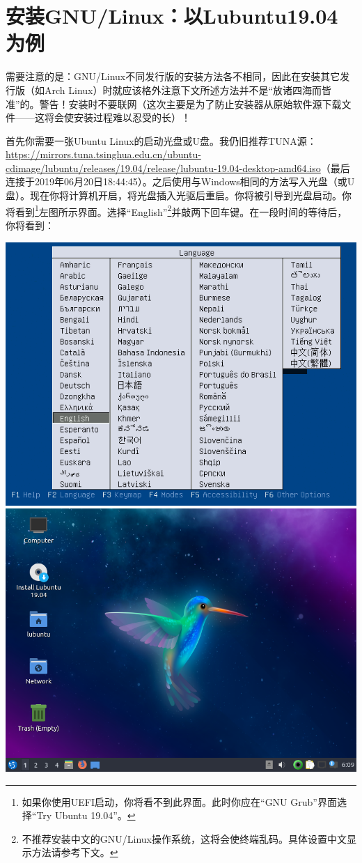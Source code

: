 \documentclass{book}
\begin{document}
\section{安装GNU/Linux：以Lubuntu19.04为例}
需要注意的是：GNU/Linux不同发行版的安装方法各不相同，因此在安装其它发行版（如Arch Linux）时就应该格外注意下文所述方法并不是“放诸四海而皆准”的。警告！安装时不要联网（这次主要是为了防止安装器从原始软件源下载文件——这将会使安装过程难以忍受的长）！\par
首先你需要一张Ubuntu Linux的启动光盘或U盘。我仍旧推荐TUNA源：\url{https://mirrors.tuna.tsinghua.edu.cn/ubuntu-cdimage/lubuntu/releases/19.04/release/lubuntu-19.04-desktop-amd64.iso}（最后连接于2019年06月20日18:44:45）。之后使用与Windows相同的方法写入光盘（或U盘）。现在你将计算机开启，将光盘插入光驱后重启。你将被引导到光盘启动。你将看到\footnote{如果你使用UEFI启动，你将看不到此界面。此时你应在“GNU Grub”界面选择“Try Ubuntu 19.04”。}左图所示界面。选择“English”\footnote{不推荐安装中文的GNU/Linux操作系统，这将会使终端乱码。具体设置中文显示方法请参考下文。}并敲两下回车键。在一段时间的等待后，你将看到：
\begin{center}
	\includegraphics[scale=0.5]{pic/lubinst1}	\includegraphics[scale=0.4]{pic/lubinst2}
\end{center}
\end{document}

